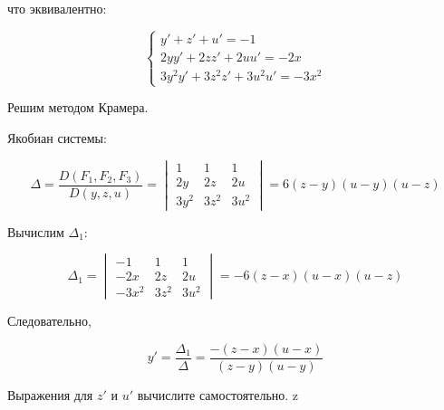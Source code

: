 {что эквивалентно:



\[
\begin{cases}
y' + z' + u' = -1 \\
2yy' + 2zz' + 2uu' = -2x \\
3y^2 y' + 3z^2 z' + 3u^2 u' = -3x^2
\end{cases}
\]



Решим методом Крамера.

Якобиан системы:



\[
\Delta = \frac{D(F_1, F_2, F_3)}{D(y, z, u)} =
\begin{vmatrix}
1 & 1 & 1 \\
2y & 2z & 2u \\
3y^2 & 3z^2 & 3u^2
\end{vmatrix}
= 6(z - y)(u - y)(u - z)
\]



Вычислим \( \Delta_1 \):



\[
\Delta_1 =
\begin{vmatrix}
-1 & 1 & 1 \\
-2x & 2z & 2u \\
-3x^2 & 3z^2 & 3u^2
\end{vmatrix}
= -6(z - x)(u - x)(u - z)
\]



Следовательно,



\[
y' = \frac{\Delta_1}{\Delta} = \frac{-(z - x)(u - x)}{(z - y)(u - y)}
\]



Выражения для \( z' \) и \( u' \) вычислите самостоятельно.
z

}